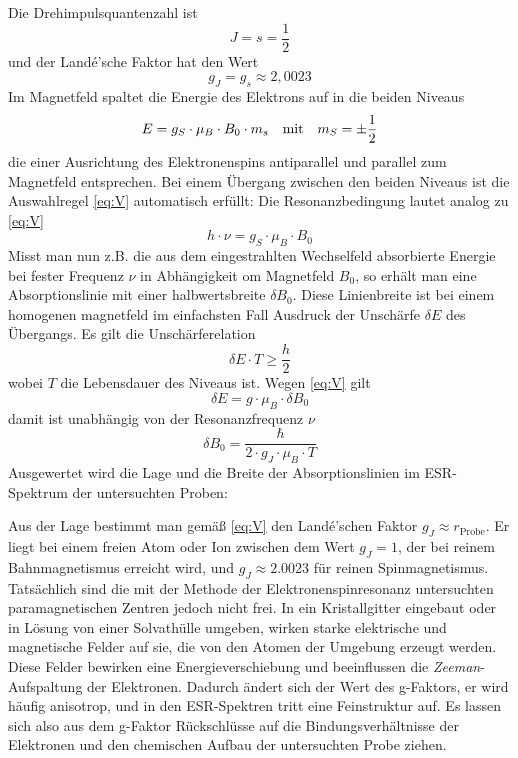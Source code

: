 \documentclass[ngerman]{scrartcl}
\begin{document}
Die Drehimpulsquantenzahl ist
\begin{equation*}
    J = s = \frac{1}{2}
\end{equation*}
und der Landé'sche Faktor hat den Wert
\begin{equation*}
    g_J = g_s \approx 2,0023
\end{equation*}
Im Magnetfeld spaltet die Energie des Elektrons auf in die beiden Niveaus
\begin{equation}
    E = g_S \cdot \mu_B \cdot B_0 \cdot m_s \qq{mit} m_S = \pm \frac{1}{2}
\end{equation}
die einer Ausrichtung des Elektronenspins antiparallel und parallel zum Magnetfeld entsprechen. Bei einem Übergang zwischen den beiden Niveaus ist die Auswahlregel \ref{eq:V} automatisch erfüllt: Die Resonanzbedingung lautet analog zu \ref{eq:V}
\begin{equation}
    h \cdot \nu = g_S \cdot \mu_B \cdot B_0
\end{equation}
Misst man nun z.B. die aus dem eingestrahlten Wechselfeld absorbierte Energie bei fester Frequenz $\nu$ in Abhängigkeit om Magnetfeld $B_0$, so erhält man eine Absorptionslinie mit einer halbwertsbreite $\delta B_0$. Diese Linienbreite ist bei einem homogenen magnetfeld im einfachsten Fall Ausdruck der Unschärfe $\delta E$ des Übergangs. Es gilt die Unschärferelation
\begin{equation}
    \delta E \cdot T \geq \frac{h}{2}
\end{equation}
wobei $T$ die Lebensdauer des Niveaus ist. Wegen \autoref{eq:V} gilt
\begin{equation}
    \delta E = g \cdot \mu_B \cdot \delta B_0
\end{equation}
damit ist unabhängig von der Resonanzfrequenz $\nu$
\begin{equation}
    \delta B_0 = \frac{\hbar}{2 \cdot g_J \cdot \mu_B \cdot T}
\end{equation}
Ausgewertet wird die Lage und die Breite der Absorptionslinien im ESR-Spektrum der untersuchten Proben:

Aus der Lage bestimmt man gemäß \autoref{eq:V} den Landé'schen Faktor $g_J \approx r_{\text{Probe}}$. Er liegt bei einem freien Atom oder Ion zwischen dem Wert $g_J = 1$, der bei reinem Bahnmagnetismus erreicht wird, und $g_J \approx \num{2.0023}$ für reinen Spinmagnetismus. Tatsächlich sind die mit der Methode der Elektronenspinresonanz untersuchten paramagnetischen Zentren jedoch nicht frei. In ein Kristallgitter eingebaut oder in Lösung von einer Solvathülle umgeben, wirken starke elektrische und magnetische Felder auf sie, die von den Atomen der Umgebung erzeugt werden. Diese Felder bewirken eine Energieverschiebung und beeinflussen die \textit{Zeeman}-Aufspaltung der Elektronen. Dadurch ändert sich der Wert des g-Faktors, er wird häufig anisotrop, und in den ESR-Spektren tritt eine Feinstruktur auf. Es lassen sich also aus dem g-Faktor Rückschlüsse
auf die Bindungsverhältnisse der Elektronen und den chemischen Aufbau der untersuchten Probe ziehen.
\end{document}
